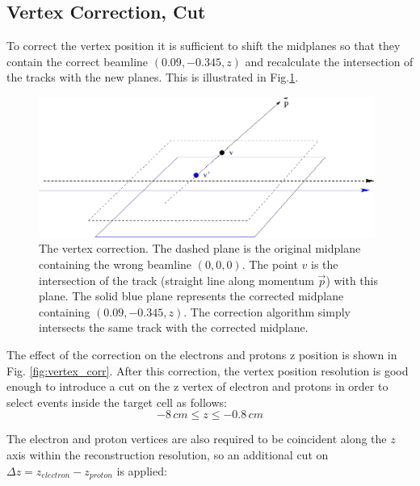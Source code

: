 \clearpage\newpage

\subsection{Vertex Correction, Cut}
To correct the vertex position it is sufficient to shift the midplanes
so that they contain the correct beamline $(0.09, -0.345, z)$ and recalculate 
the intersection of the tracks with the new planes.
This is illustrated in Fig.\ref{fig:vertex}.

\vspace{1cm}
\begin{figure}[h]
	\centering
		\includegraphics[width=0.98\textwidth ]{img/corr_vertex.jpg}
			\caption{The vertex correction. The dashed plane is the original midplane
						containing the wrong beamline $(0, 0, 0)$. The point $v$ is the 
						intersection of the track (straight line along momentum $\vec p$)
						with this plane. The solid blue plane represents the corrected
						midplane containing $(0.09, -0.345, z)$. The correction algorithm 
						simply intersects the same track with the corrected midplane. }
			\label{fig:vertex}
\end{figure}

\vspace{1cm}
The effect of the correction on the electrons and protons z position
is shown in Fig. \ref{fig:vertex_corr}. 
After this correction, the vertex position resolution is good enough to
introduce a cut on the z vertex of electron and protons in order to
select events inside the target cell as follows:
\begin{equation}
 -8\, cm \le z \le -0.8\, cm
\label{eqn:vertex_cut1} 
\end{equation}

The electron and proton vertices are also required to be coincident along the $z$ axis
within the reconstruction resolution, so an additional cut on
$\Delta z = z_{electron} - z_{proton}$ is applied:

